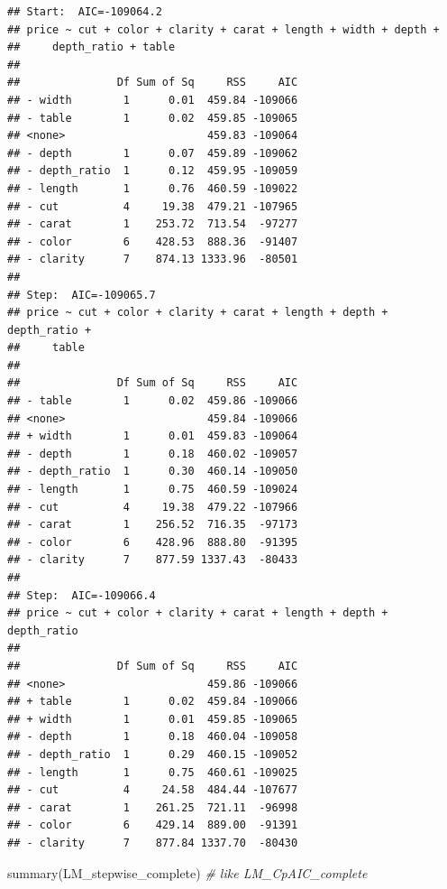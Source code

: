 \documentclass[
]{article}
\newenvironment{Shaded}{\begin{snugshade}}{\end{snugshade}}
\newcommand{\CommentTok}[1]{\textcolor[rgb]{0.56,0.35,0.01}{\textit{#1}}}
\newcommand{\FunctionTok}[1]{\textcolor[rgb]{0.00,0.00,0.00}{#1}}
\newcommand{\NormalTok}[1]{#1}
\begin{document}
\begin{verbatim}
## Start:  AIC=-109064.2
## price ~ cut + color + clarity + carat + length + width + depth +
##     depth_ratio + table
##
##               Df Sum of Sq     RSS     AIC
## - width        1      0.01  459.84 -109066
## - table        1      0.02  459.85 -109065
## <none>                      459.83 -109064
## - depth        1      0.07  459.89 -109062
## - depth_ratio  1      0.12  459.95 -109059
## - length       1      0.76  460.59 -109022
## - cut          4     19.38  479.21 -107965
## - carat        1    253.72  713.54  -97277
## - color        6    428.53  888.36  -91407
## - clarity      7    874.13 1333.96  -80501
##
## Step:  AIC=-109065.7
## price ~ cut + color + clarity + carat + length + depth + depth_ratio +
##     table
##
##               Df Sum of Sq     RSS     AIC
## - table        1      0.02  459.86 -109066
## <none>                      459.84 -109066
## + width        1      0.01  459.83 -109064
## - depth        1      0.18  460.02 -109057
## - depth_ratio  1      0.30  460.14 -109050
## - length       1      0.75  460.59 -109024
## - cut          4     19.38  479.22 -107966
## - carat        1    256.52  716.35  -97173
## - color        6    428.96  888.80  -91395
## - clarity      7    877.59 1337.43  -80433
##
## Step:  AIC=-109066.4
## price ~ cut + color + clarity + carat + length + depth + depth_ratio
##
##               Df Sum of Sq     RSS     AIC
## <none>                      459.86 -109066
## + table        1      0.02  459.84 -109066
## + width        1      0.01  459.85 -109065
## - depth        1      0.18  460.04 -109058
## - depth_ratio  1      0.29  460.15 -109052
## - length       1      0.75  460.61 -109025
## - cut          4     24.58  484.44 -107677
## - carat        1    261.25  721.11  -96998
## - color        6    429.14  889.00  -91391
## - clarity      7    877.84 1337.70  -80430
\end{verbatim}

\begin{Shaded}
\begin{Highlighting}[]
\FunctionTok{summary}\NormalTok{(LM\_stepwise\_complete)   }\CommentTok{\# like LM\_CpAIC\_complete}
\end{Highlighting}
\end{Shaded}
\end{document}
